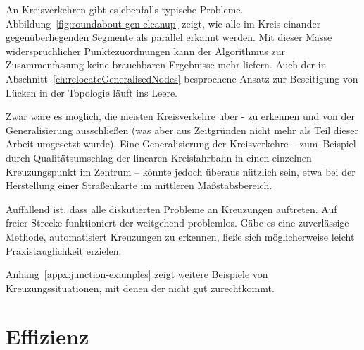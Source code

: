 \documentclass[../main/thesis.tex]{subfiles}
\begin{document}
An Kreisverkehren gibt es ebenfalls typische Probleme.
Abbildung~\ref{fig:roundabout-gen-cleanup} zeigt, wie alle im Kreis einander gegenüberliegenden Segmente als parallel erkannt werden.
Mit dieser Masse widersprüchlicher Punktezuordnungen kann der Algorithmus zur Zusammenfassung keine brauchbaren Ergebnisse mehr liefern.
Auch der in Abschnitt~\ref{ch:relocateGeneralisedNodes} besprochene Ansatz zur Beseitigung von Lücken in der Topologie läuft ins Leere.


Zwar wäre es möglich, die meisten Kreisverkehre über \osm- zu erkennen und von der Generalisierung ausschließen (was aber aus Zeitgründen nicht mehr als Teil dieser Arbeit umgesetzt wurde).
Eine Generalisierung der Kreisverkehre -- zum~Beispiel durch Qualitätsumschlag der linearen Kreisfahrbahn in einen einzelnen Kreuzungspunkt im Zentrum -- könnte jedoch überaus nützlich sein, etwa bei der Herstellung einer Straßenkarte im mittleren Maßstabsbereich.

\newpage
Auffallend ist, dass alle diskutierten Probleme an Kreuzungen auftreten.
Auf freier Strecke funktioniert der  weitgehend problemlos.
Gäbe es eine zuverlässige Methode, automatisiert Kreuzungen zu erkennen, ließe sich möglicherweise leicht Praxistauglichkeit erzielen.

Anhang~\ref{appx:junction-examples} zeigt weitere Beispiele von Kreuzungssituationen, mit denen der  nicht gut zurechtkommt.



\section{Effizienz}
\end{document}
